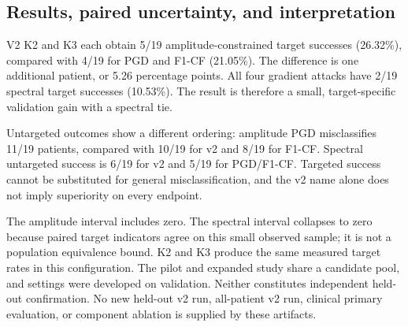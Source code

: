 \begin{table}[htbp]\centering\scriptsize

\caption{Expanded v2 validation outcomes. All cells contain 19 patients. ``Hits'' and percentages denote exact-target diagnosis, which equals released-target-claim success in this run. ``Any'' counts any wrong diagnosis. Amp and Spec refer to the amplitude and spectral constraint, respectively.}
\label{tab:adaptivev2}\end{table}


\subsection{Results, paired uncertainty, and interpretation}
V2 K2 and K3 each obtain 5/19 amplitude-constrained target successes (26.32\%), compared with 4/19 for PGD and F1-CF (21.05\%). The difference is one additional patient, or 5.26 percentage points. All four gradient attacks have 2/19 spectral target successes (10.53\%). The result is therefore a small, target-specific validation gain with a spectral tie.

Untargeted outcomes show a different ordering: amplitude PGD misclassifies 11/19 patients, compared with 10/19 for v2 and 8/19 for F1-CF. Spectral untargeted success is 6/19 for v2 and 5/19 for PGD/F1-CF. Targeted success cannot be substituted for general misclassification, and the v2 name alone does not imply superiority on every endpoint.

\begin{table}[htbp]\centering\small

\caption{Paired target-ASR differences against PGD. Nominal percentile intervals use 10,000 patient resamples and seed 42; all arms remain paired on each resample. They are pointwise development intervals with no multiplicity correction.}
\label{tab:adaptivepaired}\end{table}

The amplitude interval includes zero. The spectral interval collapses to zero because paired target indicators agree on this small observed sample; it is not a population equivalence bound. K2 and K3 produce the same measured target rates in this configuration. The pilot and expanded study share a candidate pool, and settings were developed on validation. Neither constitutes independent held-out confirmation. No new held-out v2 run, all-patient v2 run, clinical primary evaluation, or component ablation is supplied by these artifacts.

